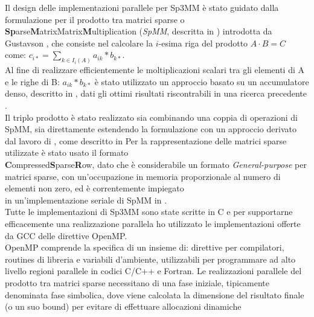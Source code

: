 Il design delle implementazioni parallele per Sp3MM è stato guidato dalla formulazione \rowbyrow per il prodotto tra matrici sparse o\\
{\bf{Sp}}arse{\bf{M}}atrixMatrix{\bf{M}}ultiplication (\emph{SpMM}, descritta in ) introdotta da Gustavson ,
che consiste nel calcolare la $i$-esima riga del prodotto $A\cdot B = C$ come:	$c_{i*} = \sum\limits_{k \in I_i(A)}  a_{ik} \ast  b_{k*}$.\\
Al fine di realizzare efficientemente le moltiplicazioni scalari tra gli elementi di A e le righe di B: $a_{ik} \ast  b_{k*}$
è stato utilizzato un approccio basato su un accumulatore denso, descritto in , 
dati gli ottimi risultati riscontrabili in una ricerca precedente \cite{intelSpMMDenseAccumulator}.\\
Il triplo prodotto è stato realizzato sia combinando una coppia di operazioni di SpMM, sia direttamente
estendendo la formulazione \rowbyrow con un approccio derivato dal lavoro di , come descritto in 
\voidLine	
Per la rappresentazione delle matrici sparse utilizzate è stato usato il formato\\{\bf{C}}ompressed{\bf{S}}parse{\bf{R}}ow,
dato che 
è considerabile un formato \emph{General-purpose} per matrici sparse, con un'occupazione in memoria proporzionale al numero di elementi non zero,
ed è correntemente impiegato \\in un'implementazione seriale di SpMM in .\\
Tutte le implementazioni di Sp3MM sono state scritte in C
e per supportarne efficacemente una realizzazione parallela ho utilizzato le implementazioni offerte da GCC delle direttive OpenMP.\\
OpenMP comprende la specifica di un insieme di: 
direttive per compilatori, routines di libreria e variabili d'ambiente, utilizzabili per programmare ad alto livello regioni parallele in codici C/C++ e Fortran.
\voidLine
Le realizzazioni parallele del prodotto tra matrici sparse necessitano di una fase iniziale, tipicamente denominata fase simbolica,
dove viene calcolata la dimensione del risultato finale (o un suo bound) per evitare di effettuare allocazioni dinamiche 
